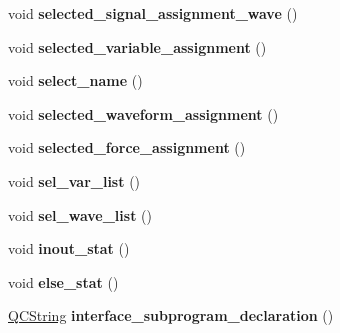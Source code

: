 \begin{DoxyCompactItemize}
void {\bfseries selected\+\_\+signal\+\_\+assignment\+\_\+wave} ()
\item 
\mbox{\label{classvhdl_1_1parser_1_1_vhdl_parser_a41e8dabce62be2b9ef4aa2a43d12fc8c}} 
void {\bfseries selected\+\_\+variable\+\_\+assignment} ()
\item 
\mbox{\label{classvhdl_1_1parser_1_1_vhdl_parser_a6d83781dc8af2cf82cdb4e6571cb06d5}} 
void {\bfseries select\+\_\+name} ()
\item 
\mbox{\label{classvhdl_1_1parser_1_1_vhdl_parser_a7bcf2019f2c0a5b12c4583a9a0f47eec}} 
void {\bfseries selected\+\_\+waveform\+\_\+assignment} ()
\item 
\mbox{\label{classvhdl_1_1parser_1_1_vhdl_parser_a4b71f9ddc6f4295400c9987db639ecec}} 
void {\bfseries selected\+\_\+force\+\_\+assignment} ()
\item 
\mbox{\label{classvhdl_1_1parser_1_1_vhdl_parser_adad3511652f319d3c884ac6474be4863}} 
void {\bfseries sel\+\_\+var\+\_\+list} ()
\item 
\mbox{\label{classvhdl_1_1parser_1_1_vhdl_parser_adf97df6156a9b482a839135019ea0a0c}} 
void {\bfseries sel\+\_\+wave\+\_\+list} ()
\item 
\mbox{\label{classvhdl_1_1parser_1_1_vhdl_parser_ad423ce460889719d7eb6552ab695c33a}} 
void {\bfseries inout\+\_\+stat} ()
\item 
\mbox{\label{classvhdl_1_1parser_1_1_vhdl_parser_a1c5549cb6c77b011588f833f8082afbc}} 
void {\bfseries else\+\_\+stat} ()
\item 
\mbox{\label{classvhdl_1_1parser_1_1_vhdl_parser_af67aabfcd0d0007ab39606a6a1505146}} 
\mbox{\hyperlink{class_q_c_string}{Q\+C\+String}} {\bfseries interface\+\_\+subprogram\+\_\+declaration} ()
\item 
\mbox{\label{classvhdl_1_1parser_1_1_vhdl_parser_a2518aa48b517c835ed02ca2c40d084cf}} 

\end{DoxyCompactItemize}
